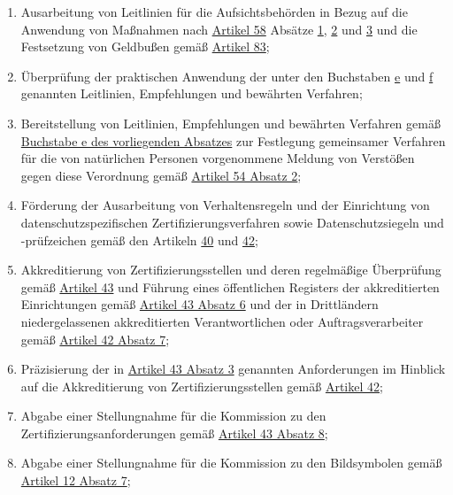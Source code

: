 \begin{enumerate}
\begin{enumerate}
    \item Ausarbeitung von Leitlinien für die Aufsichtsbehörden in Bezug auf die Anwendung von Maßnahmen nach \hyperref
     [ch:58]{Artikel 58} Absätze \hyperref[itm:58-1]{1}, \hyperref[itm:58-2]{2} und \hyperref[itm:58-3]{3} und die
     Festsetzung von Geldbußen gemäß \hyperref[ch:83]{Artikel 83};
    \label{itm:70-1k}

    \item Überprüfung der praktischen Anwendung der unter den Buchstaben \hyperref[itm:70-1e]{e} und \hyperref
     [itm:70-1f]{f} genannten Leitlinien, Empfehlungen und bewährten Verfahren;
    \label{itm:70-1l}

    \item Bereitstellung von Leitlinien, Empfehlungen und bewährten Verfahren gemäß \hyperref[itm:70-1e]{Buchstabe e des
     vorliegenden Absatzes} zur Festlegung gemeinsamer Verfahren für die von natürlichen Personen vorgenommene Meldung
     von Verstößen gegen diese Verordnung gemäß \hyperref[itm:54-2]{Artikel 54 Absatz 2};
    \label{itm:70-1m}

    \item Förderung der Ausarbeitung von Verhaltensregeln und der Einrichtung von datenschutzspezifischen
     Zertifizierungsverfahren sowie Datenschutzsiegeln und -prüfzeichen gemäß den Artikeln \hyperref[ch:40]{40} und
     \hyperref[ch:42]{42};
    \label{itm:70-1n}

    \item Akkreditierung von Zertifizierungsstellen und deren regelmäßige Überprüfung gemäß \hyperref[ch:43]{Artikel 43}
     und Führung eines öffentlichen Registers der akkreditierten Einrichtungen gemäß \hyperref[itm:43-6]{Artikel 43
     Absatz 6} und der in Drittländern niedergelassenen akkreditierten Verantwortlichen oder Auftragsverarbeiter
     gemäß \hyperref[itm:42-7]{Artikel 42 Absatz 7};
    \label{itm:70-1o}

    \item Präzisierung der in \hyperref[itm:43-3]{Artikel 43 Absatz 3} genannten Anforderungen im Hinblick auf die
     Akkreditierung von Zertifizierungsstellen gemäß \hyperref[ch:42]{Artikel 42};
    \label{itm:70-1p}

    \item Abgabe einer Stellungnahme für die Kommission zu den Zertifizierungsanforderungen gemäß \hyperref[itm:43-8]
     {Artikel 43 Absatz 8};
    \label{itm:70-1q}

    \item Abgabe einer Stellungnahme für die Kommission zu den Bildsymbolen gemäß \hyperref[itm:12-7]{Artikel 12 Absatz
     7};
    \label{itm:70-1r}


\end{enumerate}
\end{enumerate}
